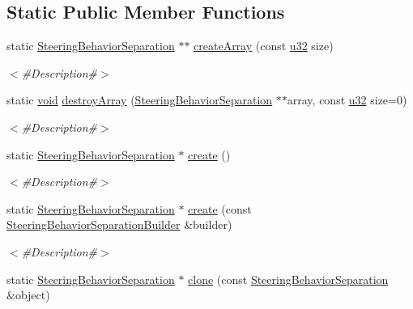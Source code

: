 \subsection*{Static Public Member Functions}
\begin{DoxyCompactItemize}
\item 
static \mbox{\hyperlink{classnjli_1_1_steering_behavior_separation}{Steering\+Behavior\+Separation}} $\ast$$\ast$ \mbox{\hyperlink{classnjli_1_1_steering_behavior_separation_a4385da20f00d15b89fcb288f7b4fc275}{create\+Array}} (const \mbox{\hyperlink{_util_8h_a10e94b422ef0c20dcdec20d31a1f5049}{u32}} size)
\begin{DoxyCompactList}\small\item\em $<$\#\+Description\#$>$ \end{DoxyCompactList}\item 
static \mbox{\hyperlink{_thread_8h_af1e856da2e658414cb2456cb6f7ebc66}{void}} \mbox{\hyperlink{classnjli_1_1_steering_behavior_separation_adc9ee8ea5b10f393f864292018b15196}{destroy\+Array}} (\mbox{\hyperlink{classnjli_1_1_steering_behavior_separation}{Steering\+Behavior\+Separation}} $\ast$$\ast$array, const \mbox{\hyperlink{_util_8h_a10e94b422ef0c20dcdec20d31a1f5049}{u32}} size=0)
\begin{DoxyCompactList}\small\item\em $<$\#\+Description\#$>$ \end{DoxyCompactList}\item 
static \mbox{\hyperlink{classnjli_1_1_steering_behavior_separation}{Steering\+Behavior\+Separation}} $\ast$ \mbox{\hyperlink{classnjli_1_1_steering_behavior_separation_ad8c345240a621873391015e2791acbeb}{create}} ()
\begin{DoxyCompactList}\small\item\em $<$\#\+Description\#$>$ \end{DoxyCompactList}\item 
static \mbox{\hyperlink{classnjli_1_1_steering_behavior_separation}{Steering\+Behavior\+Separation}} $\ast$ \mbox{\hyperlink{classnjli_1_1_steering_behavior_separation_aa6421180da4f429f8957cc69cc6e94b9}{create}} (const \mbox{\hyperlink{classnjli_1_1_steering_behavior_separation_builder}{Steering\+Behavior\+Separation\+Builder}} \&builder)
\begin{DoxyCompactList}\small\item\em $<$\#\+Description\#$>$ \end{DoxyCompactList}\item 
static \mbox{\hyperlink{classnjli_1_1_steering_behavior_separation}{Steering\+Behavior\+Separation}} $\ast$ \mbox{\hyperlink{classnjli_1_1_steering_behavior_separation_a2053f3c1a9fe4f8d65bce940be50a7fd}{clone}} (const \mbox{\hyperlink{classnjli_1_1_steering_behavior_separation}{Steering\+Behavior\+Separation}} \&object)

\end{DoxyCompactItemize}
